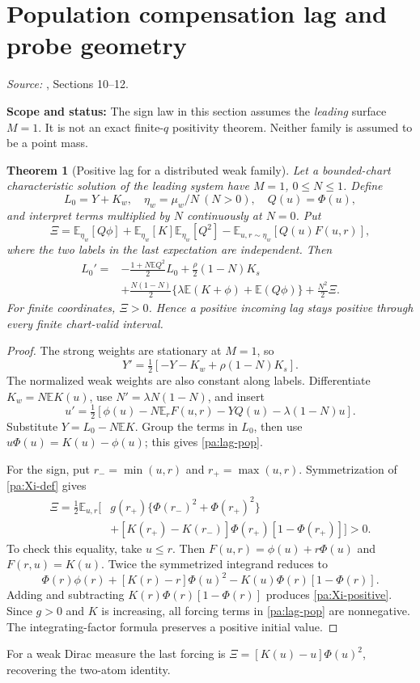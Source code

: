 \documentclass[11pt]{article}
\numberwithin{equation}{section}
\newtheorem{theorem}[proposition]{Theorem}
\theoremstyle{definition}
\theoremstyle{remark}
\newcommand{\E}{\mathbb E}
\newcommand{\1}{\mathbf 1}
\newcommand{\scope}[1]{\par\noindent\textbf{Scope and status:} #1\par\smallskip}
\newcommand{\source}[1]{\par\noindent\textit{Source:} #1\par\smallskip}
\begin{document}
\section{Population compensation lag and probe geometry}\label{pa:lagpop}
\source{\cite{SP}, Sections 10--12.}
\scope{The sign law in this section assumes the \emph{leading} surface $M=1$.
It is not an exact finite-$q$ positivity theorem. Neither family is assumed
to be a point mass.}

\begin{theorem}[Positive lag for a distributed weak family]\label{pa:lagtheorem}
Let a bounded-chart characteristic solution of the leading system have
$M=1$, $0\le N\le1$. Define
\[
 L_0=Y+K_w,
 \quad \eta_w=\mu_w/N\ (N>0),\quad Q(u)=\Phi(u),
\]
and interpret terms multiplied by $N$ continuously at $N=0$. Put
\begin{equation}\label{pa:Xi-def}
 \Xi=\E_{\eta_w}[Q\phi]+\E_{\eta_w}[K]\E_{\eta_w}[Q^2]
 -\E_{u,r\sim\eta_w}[Q(u)F(u,r)],
\end{equation}
where the two labels in the last expectation are independent. Then
\begin{align}\label{pa:lag-pop}
 L_0'={}&-\frac{1+N\E Q^2}{2}L_0
 +\frac\rho2(1-N)K_s\nonumber\\
 &+\frac{N(1-N)}2\{\lambda\E(K+\phi)+\E(Q\phi)\}
 +\frac{N^2}{2}\Xi.
\end{align}
For finite coordinates, $\Xi>0$. Hence a positive incoming lag stays positive
through every finite chart-valid interval.
\end{theorem}
\begin{proof}
The strong weights are stationary at $M=1$, so
\[
 Y'=\tfrac12[-Y-K_w+\rho(1-N)K_s].
\]
The normalized weak weights are also constant along labels. Differentiate
$K_w=N\E K(u)$, use $N'=\lambda N(1-N)$, and insert
\[
 u'=\tfrac12[\phi(u)-N\E_rF(u,r)-YQ(u)-\lambda(1-N)u].
\]
Substitute $Y=L_0-N\E K$. Group the terms in $L_0$, then use
$u\Phi(u)=K(u)-\phi(u)$; this gives \eqref{pa:lag-pop}.

For the sign, put $r_-=\min(u,r)$ and $r_+=\max(u,r)$.
Symmetrization of \eqref{pa:Xi-def} gives
\begin{align}\label{pa:Xi-positive}
 \Xi=\frac12\E_{u,r}\big[&g(r_+)
 \{\Phi(r_-)^2+\Phi(r_+)^2\}\nonumber\\
 &+[K(r_+)-K(r_-)]\Phi(r_+)[1-\Phi(r_+)]\big]>0.
\end{align}
To check this equality, take $u\le r$. Then
$F(u,r)=\phi(u)+r\Phi(u)$ and $F(r,u)=K(u)$.
Twice the symmetrized integrand reduces to
\[
 \Phi(r)\phi(r)+[K(r)-r]\Phi(u)^2
 -K(u)\Phi(r)[1-\Phi(r)].
\]
Adding and subtracting $K(r)\Phi(r)[1-\Phi(r)]$ produces
\eqref{pa:Xi-positive}. Since $g>0$ and $K$ is increasing, all forcing
terms in \eqref{pa:lag-pop} are nonnegative. The integrating-factor formula
preserves a positive initial value.
\end{proof}
For a weak Dirac measure the last forcing is
$\Xi=[K(u)-u]\Phi(u)^2$, recovering the two-atom identity.
\end{document}
